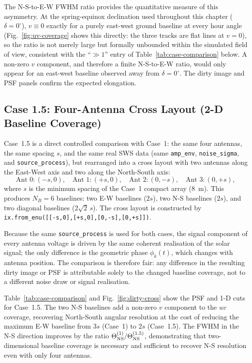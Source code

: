 The N-S-to-E-W FWHM ratio provides the quantitative measure of this asymmetry.
At the spring-equinox declination used throughout this chapter ($\delta=0^\circ$),
$v\equiv0$ exactly for a purely east-west ground baseline at every hour angle
(Fig.~\ref{fig:uv-coverage} shows this directly: the three tracks are flat lines
at $v=0$), so the ratio is not merely large but formally unbounded within the
simulated field of view, consistent with the ``$\gg1$'' entry of
Table~\ref{tab:case-comparison} below. A non-zero $v$
component, and therefore a finite N-S-to-E-W ratio, would only appear for an
east-west baseline observed away from $\delta=0^\circ$. The dirty image and
PSF panels confirm the expected elongation.

\subsection{Case 1.5: Four-Antenna Cross Layout (2-D Baseline Coverage)}
\label{subsec:case15}

Case~1.5 is a direct controlled comparison with Case~1: the same four antennas,
the same spacing $s$, and the same real SWS data (same \texttt{amp\_env},
\texttt{noise\_sigma}, and \texttt{source\_process}), but rearranged into a
cross layout with two antennas along the East-West axis and two along the
North-South axis:
\begin{equation}
  \text{Ant~0}: (-s,0),\quad \text{Ant~1}: (+s,0),\quad
  \text{Ant~2}: (0,-s),\quad \text{Ant~3}: (0,+s),
\end{equation}
where $s$ is the minimum spacing of the Case~1 compact array (8~m). This
produces $N_B = 6$ baselines: two E-W baselines ($2s$), two N-S baselines
($2s$), and two diagonal baselines ($2\sqrt{2}\,s$). The cross layout is
constructed by \texttt{ix.from\_enu([[-s,0],[+s,0],[0,-s],[0,+s]])}.

Because the same \texttt{source\_process} is used for both cases, the signal
component of every antenna voltage is driven by the same coherent realisation
of the solar signal; the only difference is the geometric phase
$\phi_k(t)$, which changes with antenna position. The comparison is therefore
fair: any difference in the resulting dirty image or PSF is attributable
solely to the changed baseline coverage, not to a different noise draw or
signal realisation.

Table~\ref{tab:case-comparison} and Fig.~\ref{fig:dirty-cross} show the PSF and
1-D cuts for Case~1.5. The two N-S baselines add a non-zero $v$ component to
the $uv$ coverage, recovering North-South angular resolution at the cost of
reducing the maximum E-W baseline from $3s$ (Case~1) to $2s$ (Case~1.5). The
FWHM in the N-S direction improves by the ratio $\Theta_{\rm NS}^{(1)}/
\Theta_{\rm NS}^{(1.5)}$, demonstrating that two-dimensional baseline coverage
is necessary and sufficient to recover N-S resolution even with only four
antennas.

